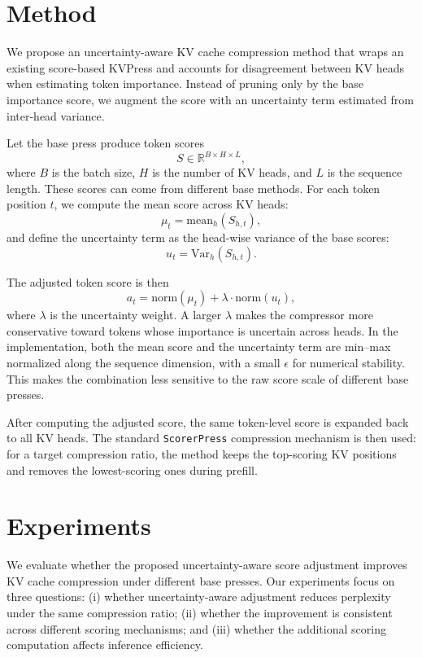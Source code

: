 \documentclass{article}
\begin{document}
\section{Method}

  We propose an uncertainty-aware KV cache compression method that
  wraps an existing score-based KVPress and accounts for disagreement between KV heads when estimating token importance. Instead of pruning only by the base importance
  score, we augment the score with an uncertainty term estimated from inter-head variance.

  Let the base press produce token scores
  \[
  S \in \mathbb{R}^{B \times H \times L},
  \]
  where \(B\) is the batch size, \(H\) is the number of KV heads, and \(L\) is the sequence length. These
  scores can come from different base methods. For each token position \(t\), we compute the mean score across KV heads:
  \[
  \mu_t = \mathrm{mean}_{h}(S_{h,t}),
  \]
  and define the uncertainty term as the head-wise variance of the base scores:
  \[
  u_t = \mathrm{Var}_{h}(S_{h,t}).
  \]

  The adjusted token score is then
  \[
  a_t = \mathrm{norm}(\mu_t) + \lambda \cdot \mathrm{norm}(u_t),
  \]
  where \(\lambda\) is the uncertainty weight. A larger \(\lambda\) makes the compressor more conservative toward tokens
  whose importance is uncertain across heads. In the implementation, both the mean score and the uncertainty term are
  min--max normalized along the sequence dimension, with a small \(\epsilon\) for numerical stability. This makes the
  combination less sensitive to the raw score scale of different base presses.

  After computing the adjusted score, the same token-level score is expanded back to all KV heads. The standard
  \texttt{ScorerPress} compression mechanism is then used: for a target compression ratio, the method keeps the top-scoring KV positions and removes the lowest-scoring ones during prefill.

\section{Experiments}  \label{sec:experiments}

We evaluate whether the proposed uncertainty-aware score adjustment improves KV cache compression under different base presses. 
Our experiments focus on three questions:
(i) whether uncertainty-aware adjustment reduces perplexity under the same compression ratio;
(ii) whether the improvement is consistent across different scoring mechanisms;
and (iii) whether the additional scoring computation affects inference efficiency.
\end{document}
